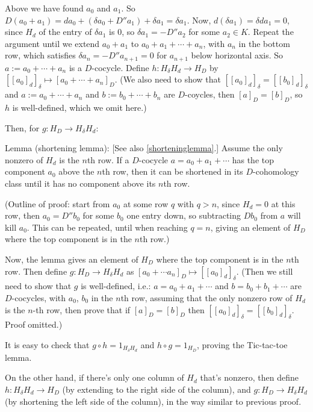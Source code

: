 \documentclass{article}
\theoremstyle{mystyle}
\theoremstyle{remark}
\numberwithin{equation}{section}
\begin{document}
Above we have found $a_0$ and $a_1$. So $D(a_0+a_1) = da_0+(\delta a_0+D''a_1)+\delta a_1 = \delta a_1$. Now, $d(\delta a_1) = \delta d a_1 = 0$,  since $H_d$ of the entry of $\delta a_1$ is 0, so $\delta a_1 = -D''a_2$ for some $a_2 \in K$. Repeat the argument until we extend $a_0+a_1$ to $a_0+a_1+\cdots + a_n$, with $a_n$ in the bottom row, which satisfies $\delta a_n = -D''a_{n+1} = 0$ for $a_{n+1}$ below horizontal axis. So $a:=a_0+\cdots +a_n$ is a $D$-cocycle. Define $h\colon H_\delta H_d\rightarrow H_D$ by $[[a_0]_d]_\delta\mapsto
[a_0+\cdots+a_n]_D$. (We also need to show that $[[a_0]_d]_\delta = [[b_0]_d]_\delta$ and $a:=a_0+\cdots+a_n$ and $b:=b_0+\cdots+b_n$ are $D$-coycles, then $[a]_D=[b]_D$, so $h$ is well-defined, which we omit here.) 

Then, for $g\colon H_D\rightarrow H_\delta H_d$: 

Lemma (shortening lemma): [See also \eqref{shorteninglemma}.] Assume the only nonzero of $H_d$ is the $n$th row. If a $D$-cocycle $a= a_0+a_1+\cdots$ has the top component $a_0$ above the $n$th row, then it can be shortened in its $D$-cohomology class until it has no component above its $n$th row.

(Outline of proof: start from $a_0$ at some row $q$ with $q>n$, since $H_d=0$ at this row, then $a_0=D''b_0$ for some $b_0$ one entry down, so subtracting $Db_0$ from $a$ will kill $a_0$. This can be repeated, until when reaching $q=n$, giving an element of $H_D$ where the top component is in the $n$th row.)

Now, the lemma gives an element of $H_D$ where the top component is in the $n$th row. Then define $g\colon H_D\rightarrow H_\delta H_d$ as $[a_0+\cdots a_n]_D\mapsto [[a_0]_d]_\delta$. (Then we still need to show that $g$ is well-defined, i.e.: $a=a_0+a_1+\cdots$ and $b= b_0+b_1+\cdots$ are $D$-cocycles, with $a_0$, $b_0$ in the $n$th row, assuming that the only nonzero row of $H_d$ is the $n$-th row, then prove that if $[a]_D=[b]_D$ then $[[a_0]_d]_\delta = [[b_0]_d]_\delta$. Proof omitted.)

It is easy to check that $g\circ h = 1_{H_\delta H_d}$ and $h\circ g = 1_{H_D}$, proving the Tic-tac-toe lemma.


On the other hand, if there's only one column of $H_d$ that's nonzero, then define $h\colon H_\delta H_d\rightarrow H_D$ (by extending to the right side of the column), and $g\colon H_D\rightarrow H_\delta H_d$ (by shortening the left side of the column), in the way similar to previous proof.
\end{document}

